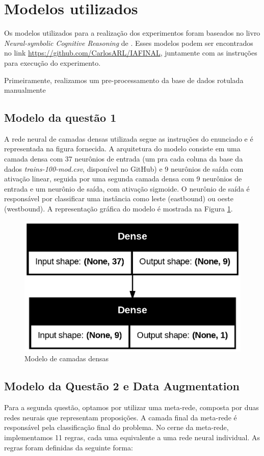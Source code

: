 \documentclass[12pt]{article}
\begin{document}
\section{Modelos utilizados}
Os modelos utilizados para a realização dos experimentos foram baseados no livro \textit{Neural-symbolic Cognitive Reasoning} de \cite{garcez2002neural}. Esses modelos podem ser encontrados no link \url{https://github.com/CarlosARL/IAFINAL}, juntamente com as instruções para execução do experimento.

Primeiramente, realizamos um pre-processamento da base de dados rotulada manualmente 

\subsection{Modelo da questão 1}
A rede neural de camadas densas utilizada segue as instruções do enunciado e é representada na figura fornecida. A arquitetura do modelo consiste em uma camada densa com 37 neurônios de entrada (um pra cada coluna da base da dados \textit{trains-100-mod.csv}, disponível no GitHub) e 9 neurônios de saída com ativação linear, seguida por uma segunda camada densa com 9 neurônios de entrada e um neurônio de saída, com ativação sigmoide. O neurônio de saída é responsável por classificar uma instância como leste (eastbound) ou oeste (westbound). A representação gráfica do modelo é mostrada na Figura \ref{fig:model1summary}.

\begin{figure}[H]
    \centering
    \includegraphics[width=0.5\linewidth]{model1summary.jpg}
    \caption{Modelo de camadas densas}
    \label{fig:model1summary}
\end{figure}

\subsection{Modelo da Questão 2 e Data Augmentation}

Para a segunda questão, optamos por utilizar uma meta-rede, composta por duas redes neurais que representam proposições. A camada final da meta-rede é responsável pela classificação final do problema. No cerne da meta-rede, implementamos 11 regras, cada uma equivalente a uma rede neural individual. As regras foram definidas da seguinte forma:
\end{document}
